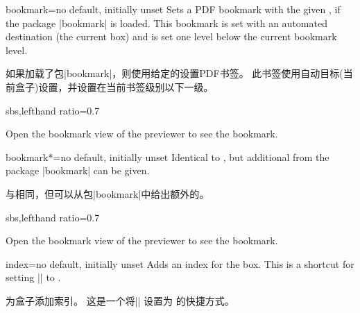 \begin{docTcbKey}[][doc new=2017-02-10]{bookmark}{=}{no default, initially unset}
Sets a PDF bookmark with the given , if the package |bookmark| \cite{oberdiek:bookmark}
is loaded. This bookmark is set with an automated destination (the current box)
and is set one level below the current bookmark level.

如果加载了包|bookmark|，则使用给定的设置PDF书签。%
此书签使用自动目标(当前盒子)设置，并设置在当前书签级别以下一级。%
\begin{dispExample*}{sbs,lefthand ratio=0.7}
\begin{tcolorbox}[colback=blue!10,colframe=blue!50!black,
bookmark=Example for using a bookmark,
title=Example for using a bookmark]
Open the bookmark view of the previewer
to see the bookmark.
\end{tcolorbox}
\end{dispExample*}
\end{docTcbKey}


\begin{docTcbKey}[][doc new=2017-02-10]{bookmark*}{=}{no default, initially unset}
Identical to , but additional 
from the package |bookmark| \cite{oberdiek:bookmark} can be given.

与相同，但可以从包|bookmark|中给出额外的。
\begin{dispExample*}{sbs,lefthand ratio=0.7}
\begin{tcolorbox}[colback=red!10,colframe=red!50!black,
bookmark*={color=red,italic,bold}%
            {Another bookmark example},
title=Red and bold bookmark]
Open the bookmark view of the previewer
to see the bookmark.
\end{tcolorbox}
\end{dispExample*}
\end{docTcbKey}

\begin{docTcbKey}[][doc new=2018-07-26]{index}{=}{no default, initially unset}
Adds an index  for the box. This is a shortcut for
setting |\index| to .

为盒子添加索引。 这是一个将|\index| 设置为 的快捷方式。
\end{docTcbKey}

